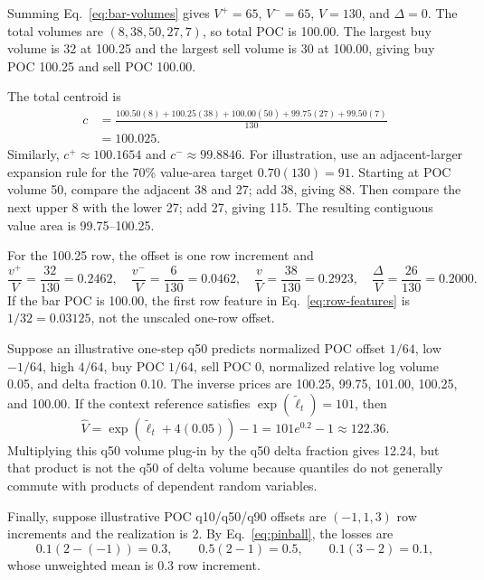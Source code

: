 \documentclass[10pt]{article}
\begin{document}
Summing Eq.~\eqref{eq:bar-volumes} gives $V^+=65$, $V^-=65$, $V=130$, and $\Delta=0$. The total
volumes are $(8,38,50,27,7)$, so total POC is 100.00. The largest buy volume is 32 at 100.25 and the
largest sell volume is 30 at 100.00, giving buy POC 100.25 and sell POC 100.00.

The total centroid is
\begin{align}
c&=\frac{100.50(8)+100.25(38)+100.00(50)+99.75(27)+99.50(7)}{130}\\
&=100.025.
\end{align}
Similarly, $c^+\approx100.1654$ and $c^-\approx99.8846$. For illustration, use an adjacent-larger
expansion rule for the 70\% value-area target $0.70(130)=91$. Starting at POC volume 50, compare the
adjacent 38 and 27; add 38, giving 88. Then
compare the next upper 8 with the lower 27; add 27, giving 115. The resulting contiguous value area
is 99.75--100.25.

For the 100.25 row, the offset is one row increment and
\begin{equation}
\frac{v^+}{V}=\frac{32}{130}=0.2462,\quad
\frac{v^-}{V}=\frac{6}{130}=0.0462,\quad
\frac{v}{V}=\frac{38}{130}=0.2923,\quad
\frac{\Delta}{V}=\frac{26}{130}=0.2000.
\end{equation}
If the bar POC is 100.00, the first row feature in Eq.~\eqref{eq:row-features} is
$1/32=0.03125$, not the unscaled one-row offset.

Suppose an illustrative one-step q50 predicts normalized POC offset $1/64$, low $-1/64$, high
$4/64$, buy POC $1/64$, sell POC 0, normalized relative log volume 0.05, and delta fraction 0.10.
The inverse prices are 100.25, 99.75, 101.00, 100.25, and 100.00. If the context reference satisfies
$\exp(\widetilde\ell_t)=101$, then
\begin{equation}
\widehat V=\exp(\widetilde\ell_t+4(0.05))-1=101e^{0.2}-1\approx122.36.
\end{equation}
Multiplying this q50 volume plug-in by the q50 delta fraction gives 12.24, but that product is not the
q50 of delta volume because quantiles do not generally commute with products of dependent random
variables.

Finally, suppose illustrative POC q10/q50/q90 offsets are $(-1,1,3)$ row increments and the
realization is 2. By Eq.~\eqref{eq:pinball}, the losses are
\begin{equation}
0.1(2-(-1))=0.3,\qquad
0.5(2-1)=0.5,\qquad
0.1(3-2)=0.1,
\end{equation}
whose unweighted mean is 0.3 row increment.
\end{document}
